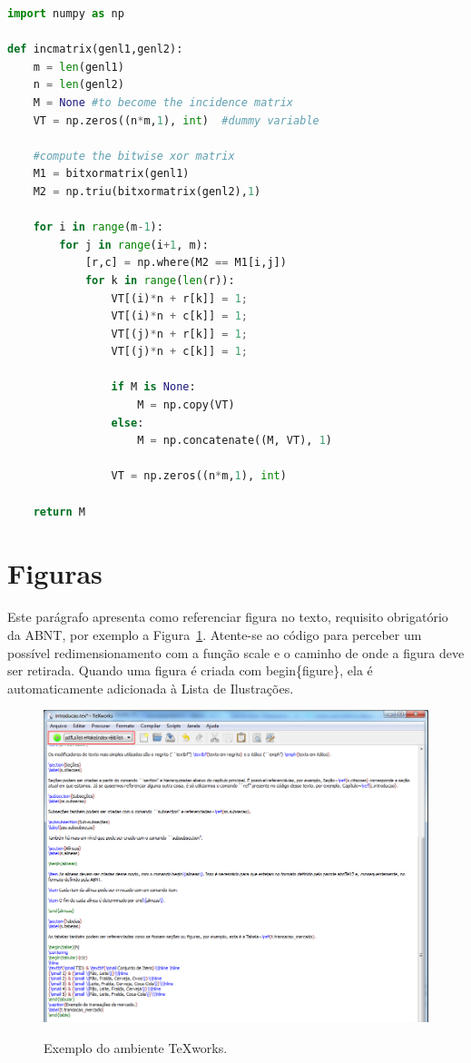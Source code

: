 \begin{lstlisting}[language=Python, caption=Exemplo de código em Python.]
import numpy as np
 
def incmatrix(genl1,genl2):
    m = len(genl1)
    n = len(genl2)
    M = None #to become the incidence matrix
    VT = np.zeros((n*m,1), int)  #dummy variable
 
    #compute the bitwise xor matrix
    M1 = bitxormatrix(genl1)
    M2 = np.triu(bitxormatrix(genl2),1) 
 
    for i in range(m-1):
        for j in range(i+1, m):
            [r,c] = np.where(M2 == M1[i,j])
            for k in range(len(r)):
                VT[(i)*n + r[k]] = 1;
                VT[(i)*n + c[k]] = 1;
                VT[(j)*n + r[k]] = 1;
                VT[(j)*n + c[k]] = 1;
 
                if M is None:
                    M = np.copy(VT)
                else:
                    M = np.concatenate((M, VT), 1)
 
                VT = np.zeros((n*m,1), int)
 
    return M
\end{lstlisting}

\section{Figuras}
\label{s.figuras}

Este parágrafo apresenta como referenciar figura no texto, requisito obrigatório da ABNT, por exemplo a Figura~\ref{f.disposicao-mercado}. Atente-se ao código para perceber um possível redimensionamento com a função scale e o caminho de onde a figura deve ser retirada. Quando uma figura é criada com begin\{figure\}, ela é automaticamente adicionada à Lista de Ilustrações.

\begin{figure}[htbp]
	\caption{\small Exemplo do ambiente TeXworks.}
	\centering
	\includegraphics[scale=0.50]{figs/tex-exemplo.png}
	\label{f.disposicao-mercado}
\end{figure}


